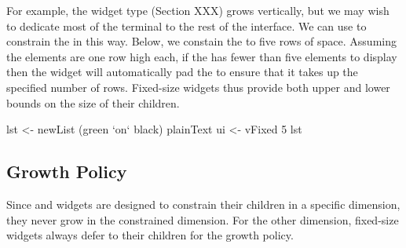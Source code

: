 For example, the  widget type (Section XXX) grows vertically,
but we may wish to dedicate most of the terminal to the rest of the
interface.  We can use  to constrain the  in this
way.  Below, we constain the  to five rows of space.
Assuming the  elements are one row high each, if the
 has fewer than five elements to display then the 
widget will automatically pad the  to ensure that it takes up
the specified number of rows.  Fixed-size widgets thus provide both
upper and lower bounds on the size of their children.

\begin{haskellcode}
 lst <- newList (green `on` black) plainText
 ui <- vFixed 5 lst
\end{haskellcode}

\subsection{Growth Policy}

Since  and  widgets are designed to constrain
their children in a specific dimension, they never grow in the
constrained dimension.  For the other dimension, fixed-size widgets
always defer to their children for the growth policy.
